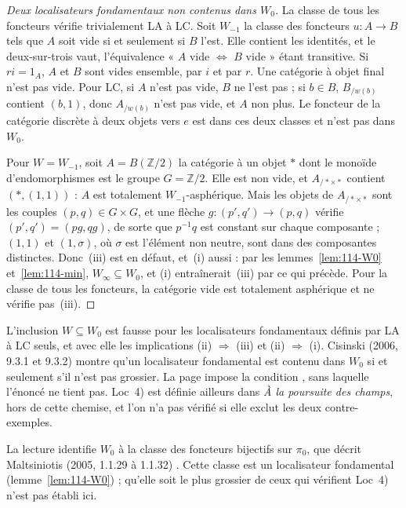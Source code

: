\begin{proof}[Deux localisateurs fondamentaux non contenus dans $W_0$]
La classe de tous les foncteurs vérifie trivialement LA à LC. Soit $W_{-1}$ la classe des foncteurs $u : A \to B$ tels que $A$ soit vide si et seulement si $B$ l'est. Elle contient les identités, et le deux-sur-trois vaut, l'équivalence « $A$ vide $\iff$ $B$ vide » étant transitive. Si $ri = 1_A$, $A$ et $B$ sont vides ensemble, par $i$ et par $r$. Une catégorie à objet final n'est pas vide. Pour LC, si $A$ n'est pas vide, $B$ ne l'est pas ; si $b \in B$, $B_{/w(b)}$ contient $(b, 1)$, donc $A_{/w(b)}$ n'est pas vide, et $A$ non plus. Le foncteur de la catégorie discrète à deux objets vers $e$ est dans ces deux classes et n'est pas dans $W_0$.

Pour $W = W_{-1}$, soit $A = B(\mathbb Z/2)$ la catégorie à un objet $\ast$ dont le monoïde d'endomorphismes est le groupe $G = \mathbb Z/2$. Elle est non vide, et $A_{/\ast \times \ast}$ contient $(\ast, (1, 1))$ : $A$ est totalement $W_{-1}$-asphérique. Mais les objets de $A_{/\ast \times \ast}$ sont les couples $(p, q) \in G \times G$, et une flèche $g : (p', q') \to (p, q)$ vérifie $(p', q') = (pg, qg)$, de sorte que $p^{-1}q$ est constant sur chaque composante ; $(1, 1)$ et $(1, \sigma)$, où $\sigma$ est l'élément non neutre, sont dans des composantes distinctes. Donc~(iii) est en défaut, et~(i) aussi : par les lemmes~\ref{lem:114-W0} et~\ref{lem:114-min}, $W_\infty \subseteq W_0$, et (i) entraînerait~(iii) par ce qui précède. Pour la classe de tous les foncteurs, la catégorie vide est totalement asphérique et ne vérifie pas~(iii).
\end{proof}

\begin{remarque}
L'inclusion $W \subseteq W_0$ est fausse pour les localisateurs fondamentaux définis par LA à LC seuls, et avec elle les implications (ii) $\Rightarrow$ (iii) et (ii) $\Rightarrow$ (i). Cisinski (2006, 9.3.1 et 9.3.2) \cite{cisinski2006} montre qu'un localisateur fondamental est contenu dans $W_0$ si et seulement s'il n'est pas grossier. La page impose la condition , sans laquelle l'énoncé ne tient pas. Loc~4) est définie ailleurs dans \emph{À la poursuite des champs}, hors de cette chemise, et l'on n'a pas vérifié si elle exclut les deux contre-exemples.
\end{remarque}

\begin{remarque}
La lecture identifie $W_0$ à la classe des foncteurs bijectifs sur $\pi_0$, que décrit Maltsiniotis (2005, 1.1.29 à 1.1.32) \cite{maltsiniotis2005}. Cette classe est un localisateur fondamental (lemme~\ref{lem:114-W0}) ; qu'elle soit le plus grossier de ceux qui vérifient Loc~4) n'est pas établi ici.
\end{remarque}

